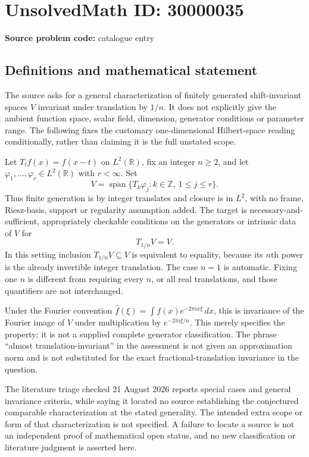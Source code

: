 \documentclass[11pt]{article}
\newcommand{\Z}{\mathbb{Z}}
\newcommand{\R}{\mathbb{R}}
\begin{document}
\section*{UnsolvedMath ID: 30000035}
\textbf{Source problem code:} catalogue entry
\subsection{Definitions and mathematical statement}
The source asks for a general characterization of finitely generated shift-invariant spaces $V$ invariant under translation by $1/n$. It does not explicitly give the ambient function space, scalar field, dimension, generator conditions or parameter range. The following fixes the customary one-dimensional Hilbert-space reading conditionally, rather than claiming it is the full unstated scope.

Let $T_t f(x)=f(x-t)$ on $L^2(\R)$, fix an integer $n\geq2$, and let $\varphi_1,\ldots,\varphi_r\in L^2(\R)$ with $r<\infty$. Set
\[
 V=\overline{\operatorname{span}}\{T_k\varphi_j:
                    k\in\Z,\ 1\leq j\leq r\}.
\]
Thus finite generation is by integer translates and closure is in $L^2$, with no frame, Riesz-basis, support or regularity assumption added. The target is necessary-and-sufficient, appropriately checkable conditions on the generators or intrinsic data of $V$ for
\[
 T_{1/n}V=V.
\]
In this setting inclusion $T_{1/n}V\subseteq V$ is equivalent to equality, because its $n$th power is the already invertible integer translation. The case $n=1$ is automatic. Fixing one $n$ is different from requiring every $n$, or all real translations, and those quantifiers are not interchanged.

Under the Fourier convention $\widehat f(\xi)=\int f(x)e^{-2\pi i x\xi}\,dx$, this is invariance of the Fourier image of $V$ under multiplication by $e^{-2\pi i\xi/n}$. This merely specifies the property; it is not a supplied complete generator classification. The phrase ``almost translation-invariant'' in the assessment is not given an approximation norm and is not substituted for the exact fractional-translation invariance in the question.

The literature triage checked 21 August 2026 reports special cases and general invariance criteria, while saying it located no source establishing the conjectured comparable characterization at the stated generality. The intended extra scope or form of that characterization is not specified. A failure to locate a source is not an independent proof of mathematical open status, and no new classification or literature judgment is asserted here.
\end{document}
